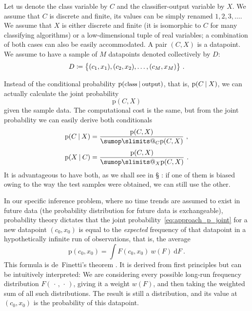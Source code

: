 \documentclass[\ifafour a4paper,12pt,\else a5paper,10pt,\fi%
onecolumn,oneside,article,%
british%
]{memoir}
\makeatletter
\theoremstyle{remark}
\theoremstyle{innote}
\def\sum{\DOTSI\sumop\slimits@}
\newcommand*{\di}{\mathrm{d}}%
\newcommand*{\defd}{\coloneqq}
\newcommand*{\dotv}{\mathord{\,\cdot\,}}%
\DeclarePairedDelimiter\set{\{}{\}} %
\newcommand*{\p}{\mathrm{p}}%
\renewcommand*{\|}[1][]{\nonscript\:#1\vert\nonscript\:\mathopen{}}
\newcommand*{\sect}{\S}%
\newcommand*{\chap}{ch.}%
\newcommand*{\pencil}{{\fontencoding{U}\fontfamily{fontawesometwo}\selectfont\symbol{210}}}
\newcommand{\mynote}[1]{ {\color{notecolour}#1}}
\newcommand*{\wf}{w}
\makeatother
\begin{document}
Let us denote the class variable by $C$ and the classifier-output variable by $X$. We assume that $C$ is discrete and finite, its values can be simply renamed $1,2,3,\dotsc$. We assume that $X$ is either discrete and finite (it is isomorphic to $C$ for many classifying algorithms) or a low-dimensional tuple of real variables; a combination of both cases can also be easily accommodated. A pair $(C, X)$ is a datapoint. We assume to have a sample of $M$ datapoints denoted collectively by $D$:
\begin{equation}
  \label{eq:sample_data_notation}
  D \defd \set[\big]{(c_{1}, x_{1}), (c_{2}, x_{2}), \dotsc, (c_{M}, x_{M}) } \ .
\end{equation}

Instead of the conditional probability $\p(\text{\small class} \| \text{\small output})$, that is, $\p(C \| X)$,  we can actually calculate the joint probability
\begin{equation}
  \label{eq:approach_p_joint}
  \p(C, X)
\end{equation}
given the sample data. The computational cost is the same, but from the joint probability we can easily derive both conditionals
\begin{align}
  \label{eq:approach_p_conditional_direct}
  \p(C \| X) &= \frac{\p(C, X)}{ \sum_{C} \p(C, X) } \ ,
  \\[\jot]
  \label{eq:approach_p_conditional_inverse}
  \p(X \| C) &= \frac{\p(C, X)}{ \sum_{X} \p(C, X) } \ .
\end{align}
It is advantageous to have both, as we shall see in \sect\mynote{\pencil}: if one of them is biased owing to the way the test samples were obtained, we can still use the other.

In our specific inference problem, where no time trends are assumed to exist in future data (the probability distribution for future data is exchangeable), probability theory dictates that the joint probability~\eqref{eq:approach_p_joint} for a new datapoint $(c_{0}, x_{0})$ is equal to the \emph{expected} frequency of that datapoint  in a hypothetically infinite run of observations, that is, the average
\begin{equation}
  \label{eq:prob_is_expe_freq}
  \p(c_{0}, x_{0}) = \int\! F(c_{0}, x_{0})\ \wf(F)\ \di F \ .
\end{equation}
This formula is de~Finetti's theorem \autocites[\chap~4]{bernardoetal1994_r2000}{dawid2013,definetti1929,definetti1937}. It is derived from first principles but can be intuitively interpreted: We are considering every possible long-run frequency distribution $F(\dotv, \dotv)$, giving it a weight $\wf(F)$, and then taking the weighted sum of all such distributions. The result is still a distribution, and its value at $(c_{0}, x_{0})$ is the probability of this datapoint.
\end{document}
